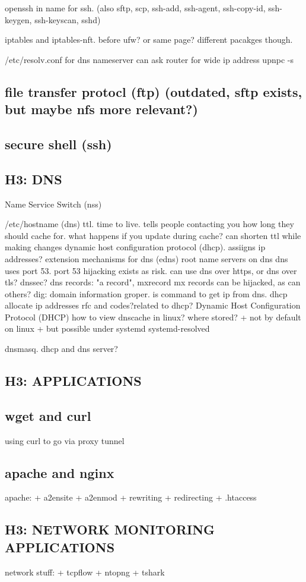 openssh in name for ssh. (also sftp, scp, ssh-add, ssh-agent, ssh-copy-id, ssh-keygen, ssh-keyscan, sshd)

iptables and iptables-nft. before ufw? or same page? different pacakges though.

/etc/resolv.conf for dns nameserver
can ask router for wide ip address
upnpc -s
\subsection{file transfer protocl (ftp) (outdated, sftp exists, but maybe nfs more relevant?)}
\subsection{secure shell (ssh)}
\subsection{H3: DNS}
Name Service Switch (nss)



/etc/hostname
(dns) ttl. time to live. tells people contacting you how long they should cache for. what happens if you update during cache? can shorten ttl while making changes
dynamic host configuration protocol (dhcp). assiigns ip addresses?
extension mechanisms for dns (edns)
root name servers on dns
dns uses port 53. port 53 hijacking exists as risk. can use dns over https, or dns over tls? dnssec?
dns records: "a record", mxrecord
mx records can be hijacked, as can others?
dig: domain information groper. is command to get ip from dns.
dhcp allocate ip addresses
rfc and codes?related to dhcp?
Dynamic Host Configuration Protocol (DHCP)
how to view dnscache in linux? where stored?
+ not by default on linux
+ but possible under systemd systemd-resolved

dnsmasq. dhcp and dns server?
\subsection{H3: APPLICATIONS}
\subsection{wget and curl}
using curl to go via proxy tunnel
\subsection{apache and nginx}
apache:
+ a2ensite
+ a2enmod
+ rewriting
+ redirecting
+ .htaccess
\subsection{H3: NETWORK MONITORING APPLICATIONS}
network stuff:
+ tcpflow
+ ntopng
+ tshark

